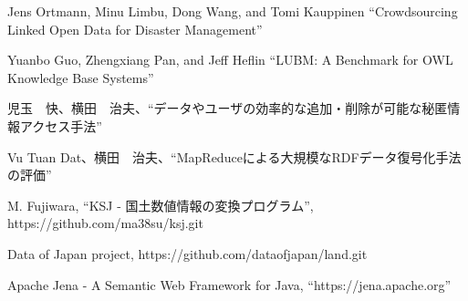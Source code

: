 ﻿%
\begin{thebibliography}{9}%
Jens Ortmann, Minu Limbu, Dong Wang, and Tomi Kauppinen ``Crowdsourcing Linked
Open Data for Disaster Management''

Yuanbo Guo, Zhengxiang Pan, and Jeff Heflin ``LUBM: A Benchmark for OWL
Knowledge Base Systems''

児玉　快、横田　治夫、``データやユーザの効率的な追加・削除が可能な秘匿情報アクセス手法''

Vu Tuan Dat、横田　治夫、``MapReduceによる大規模なRDFデータ復号化手法の評価'' 

M. Fujiwara, ``KSJ - 国土数値情報の変換プログラム'', https://github.com/ma38su/ksj.git

Data of Japan project, https://github.com/dataofjapan/land.git

Apache Jena - A Semantic Web Framework for Java, ``https://jena.apache.org''

\end{thebibliography}
